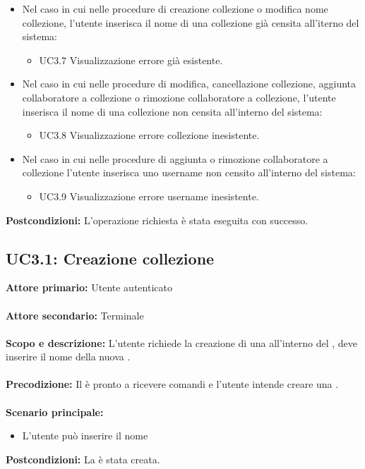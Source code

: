 \documentclass{scalatekids-article}
\begin{document}
\begin{itemize}
\item Nel caso in cui nelle procedure di creazione collezione o modifica nome collezione, l'utente inserisca il nome di una collezione già censita all'iterno del sistema:
  \begin{itemize}
  \item UC3.7 Visualizzazione errore  già esistente.
  \end{itemize}
\item Nel caso in cui nelle procedure di modifica, cancellazione collezione, aggiunta collaboratore a collezione o rimozione collaboratore a collezione, l'utente inserisca il nome di una collezione non censita all'interno del sistema:
  \begin{itemize}
  \item UC3.8 Visualizzazione errore collezione inesistente.
  \end{itemize}
\item Nel caso in cui nelle procedure di aggiunta o rimozione collaboratore a collezione l'utente inserisca uno username non censito all'interno del sistema:
  \begin{itemize}
  \item UC3.9 Visualizzazione errore username inesistente.
  \end{itemize}
\end{itemize}
\textbf{Postcondizioni:} L'operazione richiesta è stata eseguita con successo.

\subsection{UC3.1: Creazione collezione}

\textbf{Attore primario:} Utente autenticato\\ \\
\textbf{Attore secondario:} Terminale\\ \\
\textbf{Scopo e descrizione:} L'utente richiede la creazione di una  all'interno del , deve inserire il nome della nuova .\\ \\
\textbf{Precodizione:} Il  è pronto a ricevere comandi e l'utente intende creare una .\\ \\
\textbf{Scenario principale:}
\begin{itemize}
\item L'utente può inserire il nome 
\end{itemize}
\textbf{Postcondizioni:} La  è stata creata.
\end{document}
